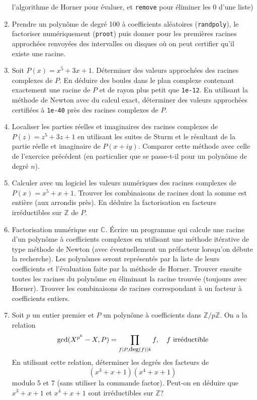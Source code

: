 \documentclass[a4paper,11pt]{book}
\begin{document}
\begin{giacjshere}
\begin{enumerate}
l'algorithme de Horner pour \'evaluer, 
et \verb|remove| pour \'eliminer les 0 d'une liste)
\item Prendre un polyn\^ome de degr\'e 100 \`a coefficients
al\'eatoires (\verb|randpoly|), le factoriser num\'eriquement
(\verb|proot|) puis donner pour les premi\`eres racines
approch\'ees renvoy\'ees des intervalles ou disques o\`u
on peut certifier qu'il existe une racine.
\item Soit $P(x)=x^5+3x+1$. D\'eterminer des valeurs approch\'ees
des racines complexes de $P$. En d\'eduire des boules dans le
plan complexe contenant exactement une racine de $P$ et
de rayon plus petit que \verb|1e-12|. En utilisant la m\'ethode
de Newton avec du calcul exact, d\'eterminer des valeurs approch\'ees
certifi\'ees \`a \verb|1e-40| pr\`es des racines complexes de $P$.
\item Localiser les parties r\'eelles et imaginaires des racines
  complexes de $P(z)=z^5+3z+1$ en utilisant les suites de Sturm
et le r\'esultant de la partie r\'eelle et imaginaire de
$P(x+iy)$. Comparer cette m\'ethode avec celle de l'exercice
pr\'ec\'edent (en particulier que se passe-t-il pour un polyn\^ome
de degr\'e $n$).
\item Calculer avec un logiciel les valeurs numériques des racines
complexes de $P(x)=x^5+x+1$. Trouver les combinaisons de racines
dont la somme est entière (aux arrondis près). En déduire la factorisation
en facteurs irréductibles sur $\mathbb{Z}$ de $P$.
\item Factorisation numérique sur $\mathbb{C}$. \'Ecrire un programme
qui calcule une racine d'un polynôme à coefficients complexes
en utilisant une méthode itérative de type méthode de Newton 
(avec éventuellement un préfacteur lorsqu'on débute la recherche).
Les polynômes seront représentés par la liste de leurs coefficients
et l'évaluation faite par la méthode de Horner.
Trouver ensuite toutes les racines du polynôme en éliminant la
racine trouvée (toujours avec Horner). Trouver les combinaisons
de racines correspondant à un facteur à coefficients entiers.
\item Soit $p$ un entier premier et $P$ un polynôme \`a
coefficients dans $\mathbb{Z}/p\mathbb{Z}$. On a la relation
\[ \mbox{gcd}(X^{p^k}-X,P) = \prod_{ f | P, \mbox{\small deg}(f) | k} f, 
\quad f \mbox{ irréductible} \]
En utilisant cette relation, 
déterminer les degrés des facteurs de 
\[ (x^3+x+1)(x^4+x+1) \]
modulo 5 et 7 (sans utiliser la commande factor). 
Peut-on en déduire que $x^3+x+1$ et
$x^4+x+1$ sont irréductibles sur $\mathbb{Z}$?

\end{enumerate}
\end{giacjshere}
\end{document}

